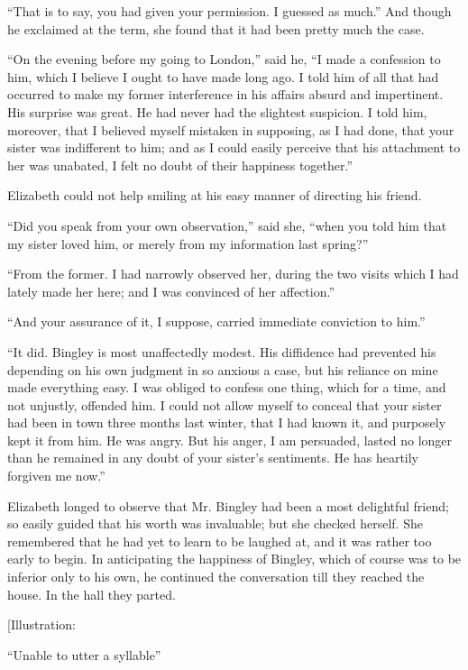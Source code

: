 \documentclass[12pt]{book}
\begin{document}
``That is to say, you had given your permission. I guessed as much.'' And though he exclaimed at the term, she found that it had been pretty much the case.

``On the evening before my going to London,'' said he, ``I made a confession to him, which I believe I ought to have made long ago. I told him of all that had occurred to make my former interference in his affairs absurd and impertinent. His surprise was great. He had never had the slightest suspicion. I told him, moreover, that I believed myself mistaken in supposing, as I had done, that your sister was indifferent to him; and as I could easily perceive that his attachment to her was unabated, I felt no doubt of their happiness together.''

Elizabeth could not help smiling at his easy manner of directing his friend.

``Did you speak from your own observation,'' said she, ``when you told him that my sister loved him, or merely from my information last spring?''

``From the former. I had narrowly observed her, during the two visits which I had lately made her here; and I was convinced of her affection.''

``And your assurance of it, I suppose, carried immediate conviction to him.''

``It did. Bingley is most unaffectedly modest. His diffidence had prevented his depending on his own judgment in so anxious a case, but his reliance on mine made everything easy. I was obliged to confess one thing, which for a time, and not unjustly, offended him. I could not allow myself to conceal that your sister had been in town three months last winter, that I had known it, and purposely kept it from him. He was angry. But his anger, I am persuaded, lasted no longer than he remained in any doubt of your sister's sentiments. He has heartily forgiven me now.''

Elizabeth longed to observe that Mr. Bingley had been a most delightful friend; so easily guided that his worth was invaluable; but she checked herself. She remembered that he had yet to learn to be laughed at, and it was rather too early to begin. In anticipating the happiness of Bingley, which of course was to be inferior only to his own, he continued the conversation till they reached the house. In the hall they parted.

[Illustration:

``Unable to utter a syllable''
\end{document}

